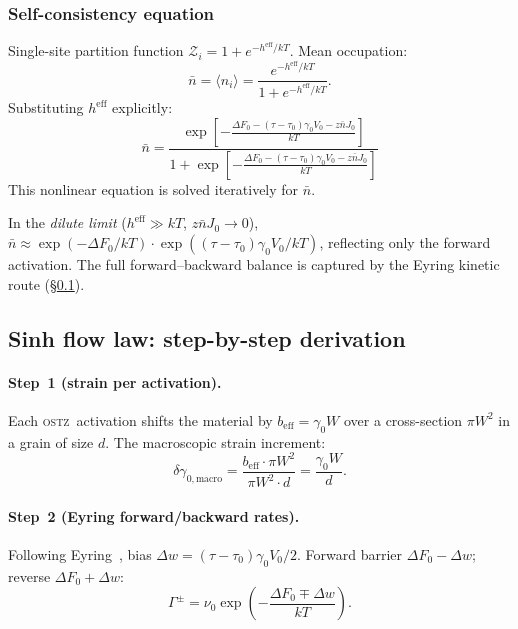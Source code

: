\documentclass[5p,sort&compress]{elsarticle}
\newcommand{\OSTZ}{\textsc{ostz}}
\newcommand{\dF}{\Delta F_0}
\newcommand{\gz}{\gamma_0}
\newcommand{\beff}{b_\mathrm{eff}}
\begin{document}
\subsubsection{Self-consistency equation}
\label{sec:selfconsistency}

Single-site partition function $\mathcal Z_i=1+e^{-h^\text{eff}/kT}$.
Mean occupation:
\begin{equation}
  \bar n=\langle n_i\rangle
  =\frac{e^{-h^\text{eff}/kT}}{1+e^{-h^\text{eff}/kT}}.
  \label{eq:selfconsistency}
\end{equation}
Substituting $h^\text{eff}$ explicitly:
\begin{equation}
  \boxed{\bar n=\frac{\exp\!\left[-\tfrac{\dF-(\tau-\tau_0)\gz V_0
    -z\bar nJ_0}{kT}\right]}{1+\exp\!\left[-\tfrac{\dF-(\tau-\tau_0)
    \gz V_0-z\bar nJ_0}{kT}\right]}}
  \label{eq:selfconsfull}
\end{equation}
This nonlinear equation is solved iteratively for $\bar n$.

In the \emph{dilute limit} ($h^\text{eff}\gg kT$, $z\bar nJ_0\to0$),
$\bar n\approx\exp(-\dF/kT)\cdot\exp((\tau-\tau_0)\gz V_0/kT)$,
reflecting only the forward activation. The full forward--backward balance
is captured by the Eyring kinetic route (\S\ref{sec:sinh}).

\subsection{Sinh flow law: step-by-step derivation}
\label{sec:sinh}

\paragraph{Step~1 (strain per activation).}
Each \OSTZ\ activation shifts the material by $\beff=\gz W$ over a
cross-section $\pi W^2$ in a grain of size $d$. The macroscopic
strain increment:
\begin{equation}
  \delta\gamma_{0,\text{macro}}=\frac{\beff\cdot\pi W^2}{\pi W^2\cdot d}
  =\frac{\gz W}{d}.
  \label{eq:deltaGamma}
\end{equation}

\paragraph{Step~2 (Eyring forward/backward rates).}
Following Eyring~\cite{eyring1935}, bias $\Delta w=(\tau-\tau_0)\gz V_0/2$.
Forward barrier $\dF-\Delta w$; reverse $\dF+\Delta w$:
\begin{equation}
  \Gamma^\pm=\nu_0\exp\!\left(-\frac{\dF\mp\Delta w}{kT}\right).
  \label{eq:Gamma}
\end{equation}
\end{document}

